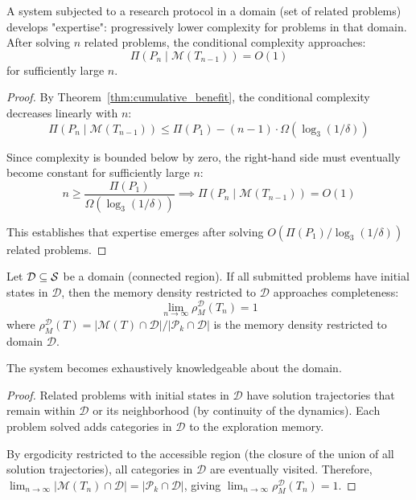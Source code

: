 \begin{corollary}
\label{cor:expertise}
A system subjected to a research protocol in a domain (set of related problems) develops "expertise": progressively lower complexity for problems in that domain. After solving $n$ related problems, the conditional complexity approaches:
\begin{equation}
\Pi(P_n \mid \mathcal{M}(T_{n-1})) = O(1)
\label{eq:expertise}
\end{equation}
for sufficiently large $n$.
\end{corollary}

\begin{proof}
By Theorem~\ref{thm:cumulative_benefit}, the conditional complexity decreases linearly with $n$:
\begin{equation}
\Pi(P_n \mid \mathcal{M}(T_{n-1})) \leq \Pi(P_1) - (n-1) \cdot \Omega(\log_3(1/\delta))
\end{equation}

Since complexity is bounded below by zero, the right-hand side must eventually become constant for sufficiently large $n$:
\begin{equation}
n \geq \frac{\Pi(P_1)}{\Omega(\log_3(1/\delta))} \implies \Pi(P_n \mid \mathcal{M}(T_{n-1})) = O(1)
\end{equation}

This establishes that expertise emerges after solving $O(\Pi(P_1) / \log_3(1/\delta))$ related problems.
\end{proof}

\begin{proposition}
\label{prop:domain_specialization}
Let $\mathcal{D} \subseteq \mathcal{S}$ be a domain (connected region). If all submitted problems have initial states in $\mathcal{D}$, then the memory density restricted to $\mathcal{D}$ approaches completeness:
\begin{equation}
\lim_{n \to \infty} \rho_M^{\mathcal{D}}(T_n) = 1
\label{eq:domain_specialization}
\end{equation}
where $\rho_M^{\mathcal{D}}(T) = |\mathcal{M}(T) \cap \mathcal{D}| / |\mathcal{P}_k \cap \mathcal{D}|$ is the memory density restricted to domain $\mathcal{D}$.

The system becomes exhaustively knowledgeable about the domain.
\end{proposition}

\begin{proof}
Related problems with initial states in $\mathcal{D}$ have solution trajectories that remain within $\mathcal{D}$ or its neighborhood (by continuity of the dynamics). Each problem solved adds categories in $\mathcal{D}$ to the exploration memory.

By ergodicity restricted to the accessible region (the closure of the union of all solution trajectories), all categories in $\mathcal{D}$ are eventually visited. Therefore, $\lim_{n \to \infty} |\mathcal{M}(T_n) \cap \mathcal{D}| = |\mathcal{P}_k \cap \mathcal{D}|$, giving $\lim_{n \to \infty} \rho_M^{\mathcal{D}}(T_n) = 1$.
\end{proof}


